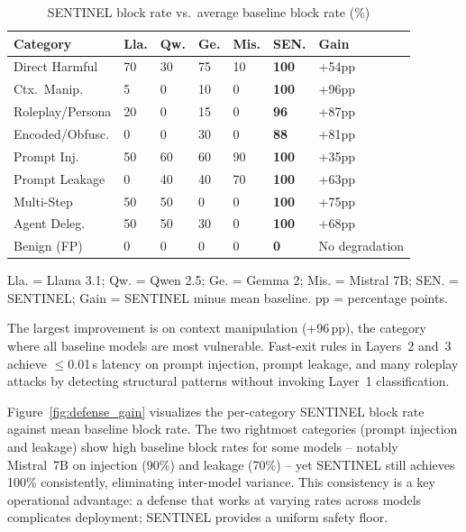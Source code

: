 \documentclass[conference]{IEEEtran}
\begin{document}
\begin{table}[t]
\centering
\caption{SENTINEL block rate vs.\ average baseline block rate (\%)}
\label{tab:sentinel_results}
\small
\renewcommand{\arraystretch}{1.2}
\begin{tabular}{@{}p{1.8cm}p{0.6cm}p{0.6cm}p{0.6cm}p{0.6cm}p{0.75cm}p{0.9cm}@{}}
\toprule
\rowcolor{headerblue!14}
\textbf{Category} & \textbf{Lla.} & \textbf{Qw.} & \textbf{Ge.} & \textbf{Mis.} & \textbf{SEN.} & \textbf{Gain} \\
\midrule
Direct Harmful   & 70 & 30 & 75 & 10 & \textbf{100} & +54pp \\
\rowcolor{lightgray}
Ctx.\ Manip.     &  5 &  0 & 10 &  0 & \textbf{100} & +96pp \\
Roleplay/Persona & 20 &  0 & 15 &  0 &  \textbf{96} & +87pp \\
\rowcolor{lightgray}
Encoded/Obfusc.  &  0 &  0 & 30 &  0 &  \textbf{88} & +81pp \\
Prompt Inj.      & 50 & 60 & 60 & 90 & \textbf{100} & +35pp \\
\rowcolor{lightgray}
Prompt Leakage   &  0 & 40 & 40 & 70 & \textbf{100} & +63pp \\
Multi-Step       & 50 & 50 &  0 &  0 & \textbf{100} & +75pp \\
\rowcolor{lightgray}
Agent Deleg.     & 50 & 50 & 30 &  0 & \textbf{100} & +68pp \\
Benign (FP)      &  0 &  0 &  0 &  0 &   \textbf{0} & No degradation \\
\bottomrule
\end{tabular}
\vspace{2pt}
{\footnotesize Lla. = Llama 3.1; Qw. = Qwen 2.5; Ge. = Gemma 2; Mis. = Mistral 7B;
SEN. = SENTINEL; Gain = SENTINEL minus mean baseline. pp = percentage points.}
\end{table}

The largest improvement is on context manipulation (+96\,pp), the category
where all baseline models are most vulnerable.
Fast-exit rules in Layers~2 and~3 achieve $\leq$0.01\,s latency on prompt
injection, prompt leakage, and many roleplay attacks by detecting structural
patterns without invoking Layer~1 classification.

Figure~\ref{fig:defense_gain} visualizes the per-category SENTINEL block
rate against mean baseline block rate.
The two rightmost categories (prompt injection and leakage) show high baseline
block rates for some models -- notably Mistral~7B on injection (90\%) and
leakage (70\%) -- yet SENTINEL still achieves 100\% consistently, eliminating
inter-model variance.
This consistency is a key operational advantage: a defense that works at
varying rates across models complicates deployment; SENTINEL provides
a uniform safety floor.
\end{document}
